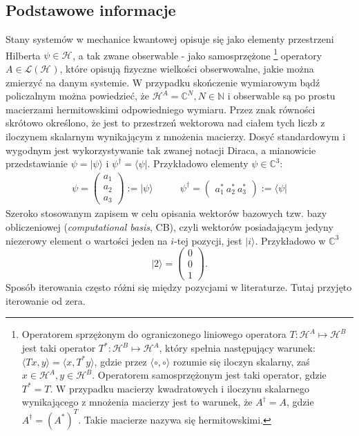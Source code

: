 \documentclass[10pt]{article} %
\newcommand{\Mats}[1]{\mathcal{L}(#1)}
\newcommand{\Hx}[1]{\mathcal{H}^{#1}}
\newcommand{\LHx}[1]{\Mats{\Hx{#1}}}
\newcommand{\Ket}[1]{|#1\rangle}
\newcommand{\Bra}[1]{\langle#1|}
\begin{document}
\subsection{Podstawowe informacje}
Stany systemów w mechanice kwantowej opisuje się jako elementy przestrzeni Hilberta $\psi \in \Hx{}$, a tak zwane obserwable - jako samosprzężone
\footnote{
Operatorem sprzężonym do ograniczonego liniowego operatora $T: \Hx{A} \mapsto \Hx{B}$ jest taki operator $T^*: \Hx{B} \mapsto \Hx{A}$, który spełnia następujący warunek: $\langle T x,  y \rangle = \langle x,T^*  y \rangle$, gdzie przez $\langle \circ, \circ \rangle$ rozumie się iloczyn skalarny, zaś $x \in \Hx{A}, y \in \Hx{B}$. Operatorem samosprzężonym jest taki operator, gdzie $T^* = T$. W przypadku macierzy kwadratowych i iloczynu skalarnego wynikającego z mnożenia macierzy jest to warunek, że $A^\dag = A$, gdzie $A^\dag = (A^*)^T$. Takie macierze nazywa się hermitowskimi.
} operatory $A \in \LHx{}$, które opisują fizyczne wielkości obserwowalne, jakie można zmierzyć na danym systemie. W przypadku skończenie wymiarowym bądź policzalnym można powiedzieć, że $\Hx{A} = \mathds{C}^N, N\in\mathds{N}$ i
obserwable są po prostu macierzami hermitowskimi odpowiedniego wymiaru. Przez znak równości skrótowo określono, że jest to przestrzeń wektorowa nad ciałem tych liczb z iloczynem skalarnym wynikającym z mnożenia macierzy. Dosyć standardowym i wygodnym jest wykorzystywanie tak zwanej notacji Diraca, a mianowicie przedstawianie $\psi = \Ket{\psi}$ i $\psi^\dag = \Bra{\psi}$.
Przykładowo elementy $\psi \in \mathds{C}^3$:
\begin{align}
\psi = 
\begin{pmatrix}
a_1\\a_2\\a_3
\end{pmatrix}
:= \Ket{\psi}
\quad & \quad\psi^\dag = 
\begin{pmatrix}
a_1^*~a_2^*~a_3^*
\end{pmatrix}
:= \Bra{\psi}
\end{align}
Szeroko stosowanym zapisem w celu opisania wektorów bazowych tzw. bazy obliczeniowej (\textit{computational basis}, CB), czyli wektorów posiadającym jedyny niezerowy element o wartości jeden na $i$-tej pozycji, jest $\Ket{i}$.
Przykładowo w $\mathds{C}^3$
\begin{equation}
\Ket{2} = \begin{pmatrix} 0\\0\\1 \end{pmatrix}.
\end{equation} Sposób iterowania często różni się między pozycjami w literaturze. Tutaj przyjęto iterowanie od zera.
\end{document}

